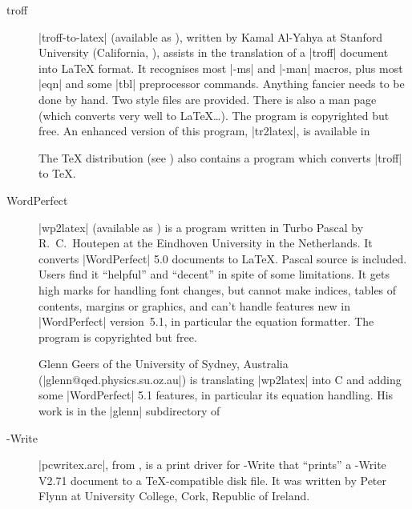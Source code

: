 \begin{description}
\item[troff] \ProgName|troff-to-latex| (available as
  ), written by Kamal Al-Yahya at Stanford
  University (California, ), assists in the translation of a
  \ProgName|troff| document into \LaTeX{} format.  It recognises most
  |-ms| and |-man| macros, plus most \ProgName|eqn| and some
  \ProgName|tbl| preprocessor commands.  Anything fancier needs to be
  done by hand. Two style files are provided. There is also a man page
  (which converts very well to \LaTeX{}\dots{}).  The program is
  copyrighted but free. An enhanced version of this program,
  \ProgName|tr2latex|, is available in 

  The  \TeX{} distribution (see
  )
  also contains a program which converts \ProgName|troff| to \TeX{}.


\item[WordPerfect] \ProgName|wp2latex| (available as
  ) is a  program
  written in Turbo Pascal by R.~C.~Houtepen at the Eindhoven
  University in the Netherlands. It converts \ProgName|WordPerfect|
  5.0 documents to \LaTeX{}. Pascal source is included.  Users find it
  ``helpful'' and ``decent'' in spite of some limitations. It gets
  high marks for handling font changes, but cannot make
  indices, tables of contents, margins or graphics, and can't
  handle features new in \ProgName|WordPerfect| version~5.1, in particular
  the equation formatter. The program is copyrighted but free.

  Glenn Geers of the University of Sydney, Australia
  (\Email|glenn@qed.physics.su.oz.au|) is translating
  \ProgName|wp2latex| into C and adding some \ProgName|WordPerfect|
  5.1 features, in particular its equation handling. His work is in
  the \File|glenn| subdirectory of 

\item[-Write] |pcwritex.arc|, from , is a
  print driver for -Write that ``prints'' a -Write
  V2.71 document to a \TeX{}-compatible disk file.  It was written by Peter
  Flynn at University College, Cork, Republic of Ireland.


\end{description}
